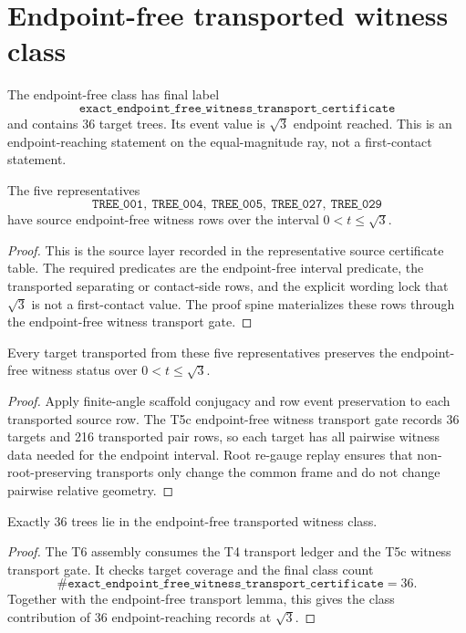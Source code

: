 
\section{Endpoint-free transported witness class}

The endpoint-free class has final label
\[
  \texttt{exact\_endpoint\_free\_witness\_transport\_certificate}
\]
and contains 36 target trees.  Its event value is \(\sqrt{3}\) endpoint reached.  This is an endpoint-reaching statement on the equal-magnitude ray, not a first-contact statement.

\begin{lemma}
The five representatives
\[
  \texttt{TREE\_001},\ \texttt{TREE\_004},\ \texttt{TREE\_005},\ \texttt{TREE\_027},\ \texttt{TREE\_029}
\]
have source endpoint-free witness rows over the interval \(0<t\le\sqrt{3}\).
\end{lemma}

\begin{proof}
This is the source layer recorded in the representative source certificate table.  The required predicates are the endpoint-free interval predicate, the transported separating or contact-side rows, and the explicit wording lock that \(\sqrt{3}\) is not a first-contact value.  The proof spine materializes these rows through the endpoint-free witness transport gate.
\end{proof}

\begin{lemma}
Every target transported from these five representatives preserves the endpoint-free witness status over \(0<t\le\sqrt{3}\).
\end{lemma}

\begin{proof}
Apply finite-angle scaffold conjugacy and row event preservation to each transported source row.  The T5c endpoint-free witness transport gate records 36 targets and 216 transported pair rows, so each target has all pairwise witness data needed for the endpoint interval.  Root re-gauge replay ensures that non-root-preserving transports only change the common frame and do not change pairwise relative geometry.
\end{proof}

\begin{proposition}
Exactly 36 trees lie in the endpoint-free transported witness class.
\end{proposition}

\begin{proof}
The T6 assembly consumes the T4 transport ledger and the T5c witness transport gate.  It checks target coverage and the final class count
\[
  \#\texttt{exact\_endpoint\_free\_witness\_transport\_certificate}=36.
\]
Together with the endpoint-free transport lemma, this gives the class contribution of 36 endpoint-reaching records at \(\sqrt{3}\).
\end{proof}
